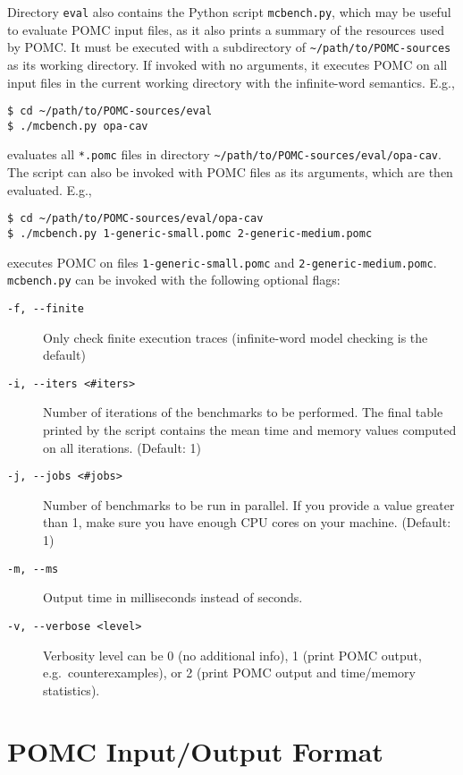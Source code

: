 \documentclass[9pt,a4paper]{article}
\begin{document}
Directory \verb|eval| also contains the Python script \verb|mcbench.py|,
which may be useful to evaluate POMC input files, as it also prints
a summary of the resources used by POMC.
It must be executed with a subdirectory of \verb|~/path/to/POMC-sources|
as its working directory.
If invoked with no arguments, it executes POMC on all input files in the current
working directory with the infinite-word semantics. E.g.,
\begin{verbatim}
$ cd ~/path/to/POMC-sources/eval
$ ./mcbench.py opa-cav
\end{verbatim}
evaluates all \verb|*.pomc| files in directory \verb|~/path/to/POMC-sources/eval/opa-cav|.
The script can also be invoked with POMC files as its arguments,
which are then evaluated. E.g.,
\begin{verbatim}
$ cd ~/path/to/POMC-sources/eval/opa-cav
$ ./mcbench.py 1-generic-small.pomc 2-generic-medium.pomc
\end{verbatim}
executes POMC on files \verb|1-generic-small.pomc| and \verb|2-generic-medium.pomc|.
\texttt{mcbench.py} can be invoked with the following optional flags:
\begin{description}
\item[\texttt{-f, -{}-finite}]
  Only check finite execution traces (infinite-word model checking is the default)
\item[\texttt{-i, -{}-iters <\#iters>}]
  Number of iterations of the benchmarks to be performed.
  The final table printed by the script contains the mean time
  and memory values computed on all iterations. (Default: 1)
\item[\texttt{-j, -{}-jobs <\#jobs>}]
  Number of benchmarks to be run in parallel.
  If you provide a value greater than 1, make sure you have
  enough CPU cores on your machine.
  (Default: 1)
\item[\texttt{-m, -{}-ms}]
  Output time in milliseconds instead of seconds.
\item[\texttt{-v, -{}-verbose <level>}]
  Verbosity level can be 0 (no additional info),
  1 (print POMC output, e.g.\ counterexamples), or
  2 (print POMC output and time/memory statistics).
\end{description}


\section{POMC Input/Output Format}
\label{sec:format}
\end{document}
